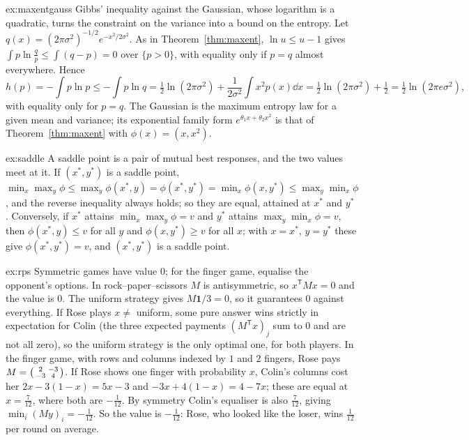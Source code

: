 \begin{solution}{ex:maxentgauss}
\idea Gibbs' inequality against the Gaussian, whose logarithm is a quadratic, turns the constraint on the variance into a bound on the entropy.
\writeup Let $q(x)=(2\pi\sigma^2)^{-1/2}e^{-x^2/2\sigma^2}$. As in Theorem~\ref{thm:maxent}, $\ln u\le u-1$ gives $\int p\ln\frac qp\le\int(q-p)=0$ over $\{p>0\}$, with equality only if $p=q$ almost
everywhere. Hence
\[
h(p)=-\int p\ln p\le-\int p\ln q=\tfrac12\ln(2\pi\sigma^2)+\frac{1}{2\sigma^2}\int x^2p(x)\dd x=\tfrac12\ln(2\pi\sigma^2)+\tfrac12=\tfrac12\ln(2\pi e\sigma^2),
\]
with equality only for $p=q$. The Gaussian is the maximum entropy law for a given mean and variance; its exponential family form $e^{\theta_1x+\theta_2x^2}$ is that of
Theorem~\ref{thm:maxent} with $\phi(x)=(x,x^2)$.
\end{solution}

\begin{solution}{ex:saddle}
\idea A saddle point is a pair of mutual best responses, and the two values meet at it.
\writeup If $(x^*,y^*)$ is a saddle point, $\min_x\max_y\phi\le\max_y\phi(x^*,y)=\phi(x^*,y^*)=\min_x\phi(x,y^*)\le\max_y\min_x\phi$, and the reverse inequality always holds; so they are
equal, attained at $x^*$ and $y^*$. Conversely, if $x^*$ attains $\min_x\max_y\phi=v$ and $y^*$ attains $\max_y\min_x\phi=v$, then $\phi(x^*,y)\le v$ for all $y$ and $\phi(x,y^*)\ge v$ for all $x$; with
$x=x^*$, $y=y^*$ these give $\phi(x^*,y^*)=v$, and $(x^*,y^*)$ is a saddle point.
\end{solution}

\begin{solution}{ex:rps}
\idea Symmetric games have value $0$; for the finger game, equalise the opponent's options.
\writeup In rock--paper--scissors $M$ is antisymmetric, so $x^{\mathsf T}Mx=0$ and the value is $0$. The uniform strategy gives $M\mathbf1/3=0$, so it guarantees $0$ against everything. If
Rose plays $x\ne$ uniform, some pure answer wins strictly in expectation for Colin (the three expected payments $(M^{\mathsf T}x)_j$ sum to $0$ and are not all zero), so the uniform strategy is
the only optimal one, for both players. In the finger game, with rows and columns indexed by $1$ and $2$ fingers, Rose pays $M=\begin{psmallmatrix}2&-3\\-3&4\end{psmallmatrix}$. If Rose shows one
finger with probability $x$, Colin's columns cost her $2x-3(1-x)=5x-3$ and $-3x+4(1-x)=4-7x$; these are equal at $x=\frac7{12}$, where both are $-\frac1{12}$. By symmetry Colin's
equaliser is also $\frac7{12}$, giving $\min_i(My)_i=-\frac1{12}$. So the value is $-\frac1{12}$: Rose, who looked like the loser, wins $\frac1{12}$ per round on average.
\end{solution}

